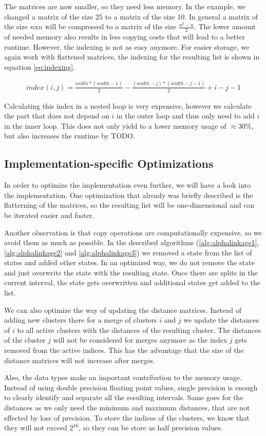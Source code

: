 The matrices are now smaller, so they need less memory. In the example, we changed a matrix of the size $25$ to a matrix of the size $10$. In general a matrix of the size $n$x$n$ will be compressed to a matrix of the size $\frac{n^2-n}{2}$. The lower amount of needed memory also results in less copying costs that will lead to a better runtime. However, the indexing is not as easy anymore. For easier storage, we again work with flattened matrices, the indexing for the resulting list is shown in equation \ref{eq:indexing}.

\begin{equation}
    \begin{aligned}
        index(i,j) = \frac{width * (width - 1)}{2} - \frac{(width - j) * (width - j - 1)}{2} + i - j - 1
    \end{aligned}
    \label{eq:indexing}
\end{equation}

Calculating this index in a nested loop is very expensive, however we calculate the part that does not depend on $i$ in the outer loop and thus only need to add $i$ in the inner loop. This does not only yield to a lower memory usage of $\approx 30\%$, but also increases the runtime by TODO.

\subsection{Implementation-specific Optimizations}

In order to optimize the implementation even further, we will have a look into the implementation. One optimization that already was briefly described is the flatterning of the matrices, so the resulting list will be one-dimensional and can be iterated easier and faster.

Another observation is that copy operations are computationally expensive, so we avoid them as much as possible. In the described algorithms (\ref{alg:alphalinkage1}, \ref{alg:alphalinkage2} and \ref{alg:alphalinkage3}) we removed a state from the list of states and added other states. In an optimized way, we do not remove the state and just overwrite the state with the resulting state. Once there are splits in the current interval, the state gets overwritten and additional states get added to the list.

We can also optimize the way of updating the distance matrices. Instead of adding new clusters there for a merge of clusters $i$ and $j$ we update the distances of $i$ to all active clusters with the distances of the resulting cluster. The distances of the cluster $j$ will not be considered for merges anymore as the index $j$ gets removed from the active indices. This has the advantage that the size of the distance matrices will not increase after merges.

Also, the data types make an important contribution to the memory usage. Instead of using double precision floating point values, single precision is enough to clearly identify and separate all the resulting intervals. Same goes for the distances as we only need the minimum and maximum distances, that are not effected by loss of precision. To store the indices of the clusters, we know that they will not exceed $2^{16}$, so they can be store as half precision values.